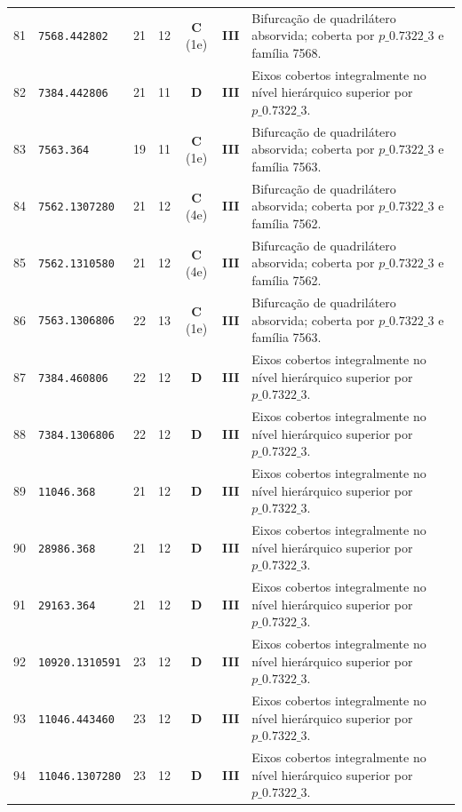 \documentclass[11pt,a4paper]{article}
\begin{document}
\begin{small}
\begin{longtable}{r l c c c c p{8.8cm}}
81 & \texttt{7568.442802} & 21 & 12 & \textbf{C} (1e) & \textbf{III} & Bifurcação de quadrilátero absorvida; coberta por $p\_0.7322\_3$ e família 7568. \\
82 & \texttt{7384.442806} & 21 & 11 & \textbf{D} & \textbf{III} & Eixos cobertos integralmente no nível hierárquico superior por $p\_0.7322\_3$. \\
83 & \texttt{7563.364} & 19 & 11 & \textbf{C} (1e) & \textbf{III} & Bifurcação de quadrilátero absorvida; coberta por $p\_0.7322\_3$ e família 7563. \\
84 & \texttt{7562.1307280} & 21 & 12 & \textbf{C} (4e) & \textbf{III} & Bifurcação de quadrilátero absorvida; coberta por $p\_0.7322\_3$ e família 7562. \\
85 & \texttt{7562.1310580} & 21 & 12 & \textbf{C} (4e) & \textbf{III} & Bifurcação de quadrilátero absorvida; coberta por $p\_0.7322\_3$ e família 7562. \\
86 & \texttt{7563.1306806} & 22 & 13 & \textbf{C} (1e) & \textbf{III} & Bifurcação de quadrilátero absorvida; coberta por $p\_0.7322\_3$ e família 7563. \\
87 & \texttt{7384.460806} & 22 & 12 & \textbf{D} & \textbf{III} & Eixos cobertos integralmente no nível hierárquico superior por $p\_0.7322\_3$. \\
88 & \texttt{7384.1306806} & 22 & 12 & \textbf{D} & \textbf{III} & Eixos cobertos integralmente no nível hierárquico superior por $p\_0.7322\_3$. \\
89 & \texttt{11046.368} & 21 & 12 & \textbf{D} & \textbf{III} & Eixos cobertos integralmente no nível hierárquico superior por $p\_0.7322\_3$. \\
90 & \texttt{28986.368} & 21 & 12 & \textbf{D} & \textbf{III} & Eixos cobertos integralmente no nível hierárquico superior por $p\_0.7322\_3$. \\
91 & \texttt{29163.364} & 21 & 12 & \textbf{D} & \textbf{III} & Eixos cobertos integralmente no nível hierárquico superior por $p\_0.7322\_3$. \\
92 & \texttt{10920.1310591} & 23 & 12 & \textbf{D} & \textbf{III} & Eixos cobertos integralmente no nível hierárquico superior por $p\_0.7322\_3$. \\
93 & \texttt{11046.443460} & 23 & 12 & \textbf{D} & \textbf{III} & Eixos cobertos integralmente no nível hierárquico superior por $p\_0.7322\_3$. \\
94 & \texttt{11046.1307280} & 23 & 12 & \textbf{D} & \textbf{III} & Eixos cobertos integralmente no nível hierárquico superior por $p\_0.7322\_3$. \\

\end{longtable}
\end{small}
\end{document}
